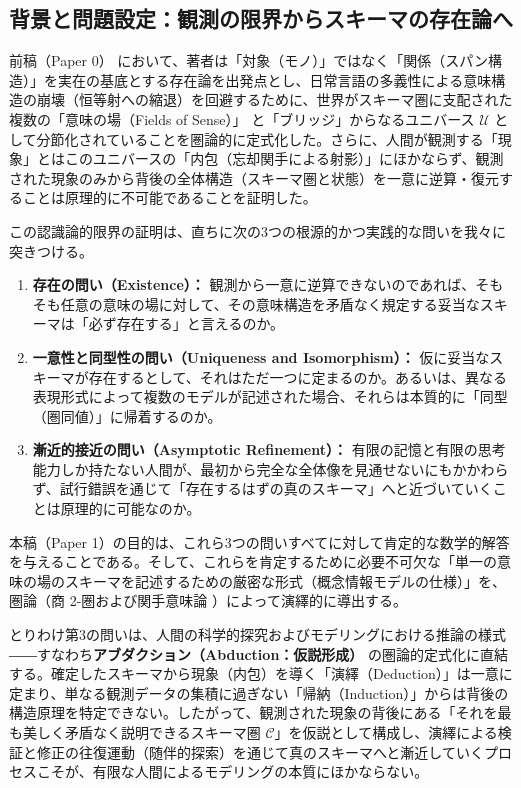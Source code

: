 \documentclass[11pt,a4paper]{ltjsarticle}
\theoremstyle{definition}
\theoremstyle{plain}
\theoremstyle{remark}
\begin{document}
\subsection{背景と問題設定：観測の限界からスキーマの存在論へ}
前稿（Paper 0）\cite{ota2026paper0} において、著者は「対象（モノ）」ではなく「関係（スパン構造）」を実在の基底とする存在論を出発点とし、日常言語の多義性による意味構造の崩壊（恒等射への縮退）を回避するために、世界がスキーマ圏に支配された複数の「意味の場（Fields of Sense）」\cite{gabriel2015} と「ブリッジ」からなるユニバース $\mathcal{U}$ として分節化されていることを圏論的に定式化した。さらに、人間が観測する「現象」とはこのユニバースの「内包（忘却関手による射影）」にほかならず、観測された現象のみから背後の全体構造（スキーマ圏と状態）を一意に逆算・復元することは原理的に不可能であることを証明した。

この認識論的限界の証明は、直ちに次の3つの根源的かつ実践的な問いを我々に突きつける。
\begin{enumerate}
    \item \textbf{存在の問い（Existence）：} 観測から一意に逆算できないのであれば、そもそも任意の意味の場に対して、その意味構造を矛盾なく規定する妥当なスキーマは「必ず存在する」と言えるのか。
    \item \textbf{一意性と同型性の問い（Uniqueness and Isomorphism）：} 仮に妥当なスキーマが存在するとして、それはただ一つに定まるのか。あるいは、異なる表現形式によって複数のモデルが記述された場合、それらは本質的に「同型（圏同値）」に帰着するのか。
    \item \textbf{漸近的接近の問い（Asymptotic Refinement）：} 有限の記憶と有限の思考能力しか持たない人間が、最初から完全な全体像を見通せないにもかかわらず、試行錯誤を通じて「存在するはずの真のスキーマ」へと近づいていくことは原理的に可能なのか。
\end{enumerate}

本稿（Paper 1）の目的は、これら3つの問いすべてに対して肯定的な数学的解答を与えることである。そして、これらを肯定するために必要不可欠な「単一の意味の場のスキーマを記述するための厳密な形式（概念情報モデルの仕様）」を、圏論（商 2-圏および関手意味論 \cite{maclane1998,lawvere1963}）によって演繹的に導出する。

とりわけ第3の問いは、人間の科学的探究およびモデリングにおける推論の様式――すなわち\textbf{アブダクション（Abduction：仮説形成）}\cite{peirce1903} の圏論的定式化に直結する。確定したスキーマから現象（内包）を導く「演繹（Deduction）」は一意に定まり、単なる観測データの集積に過ぎない「帰納（Induction）」からは背後の構造原理を特定できない。したがって、観測された現象の背後にある「それを最も美しく矛盾なく説明できるスキーマ圏 $\mathcal{C}$」を仮説として構成し、演繹による検証と修正の往復運動（随伴的探索）を通じて真のスキーマへと漸近していくプロセスこそが、有限な人間によるモデリングの本質にほかならない。
\end{document}
